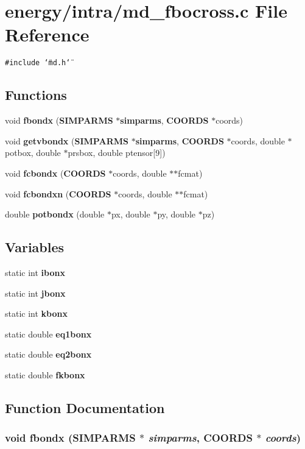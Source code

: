 \section{energy/intra/md\_\-fbocross.c File Reference}
\label{md__fbocross_8c}
{\tt \#include \char`\"{}md.h\char`\"{}}\par
\subsection*{Functions}
\begin{CompactItemize}
\item 
void {\bf fbondx} ({\bf SIMPARMS} $\ast${\bf simparms}, {\bf COORDS} $\ast$coords)
\item 
void {\bf getvbondx} ({\bf SIMPARMS} $\ast${\bf simparms}, {\bf COORDS} $\ast$coords, double $\ast$potbox, double $\ast$prsbox, double ptensor[9])
\item 
void {\bf fcbondx} ({\bf COORDS} $\ast$coords, double $\ast$$\ast$fcmat)
\item 
void {\bf fcbondxn} ({\bf COORDS} $\ast$coords, double $\ast$$\ast$fcmat)
\item 
double {\bf potbondx} (double $\ast$px, double $\ast$py, double $\ast$pz)
\end{CompactItemize}
\subsection*{Variables}
\begin{CompactItemize}
\item 
static int {\bf ibonx}
\item 
static int {\bf jbonx}
\item 
static int {\bf kbonx}
\item 
static double {\bf eq1bonx}
\item 
static double {\bf eq2bonx}
\item 
static double {\bf fkbonx}
\end{CompactItemize}


\subsection{Function Documentation}
\subsubsection{\setlength{\rightskip}{0pt plus 5cm}void fbondx ({\bf SIMPARMS} $\ast$ {\em simparms}, {\bf COORDS} $\ast$ {\em coords})}\label{md__fbocross_8c_ffe75499444eb1de2a21416e1196a610}


